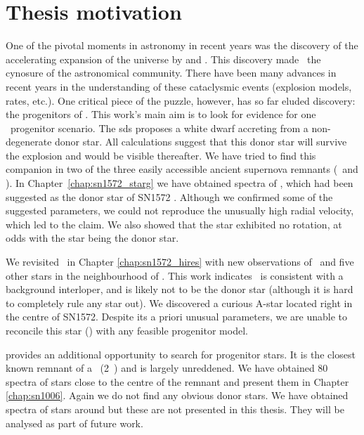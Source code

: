 \section{Thesis motivation}
One of the pivotal moments in astronomy in recent years was the discovery of the accelerating expansion of the universe by \citet{1998AJ....116.1009R} and \citet{1999ApJ...517..565P}. This discovery made \sneia\ the cynosure of the astronomical community. There have been many advances in recent years in the understanding of these cataclysmic events (explosion models, rates, etc.). One critical piece of the puzzle, however, has so far eluded discovery: the progenitors of \sneia. This work's main aim is to look for evidence for one \snia\ progenitor scenario. The \gls{sds} proposes a white dwarf accreting from a non-degenerate donor star. All calculations suggest that this donor star will survive the explosion and would be visible thereafter. We have tried to find this companion in two of the three easily accessible ancient supernova remnants (\ and ). In Chapter~\ref{chap:sn1572_starg} we have obtained spectra of \starg, which had been suggested as the donor star of SN1572 \citep{2004Natur.431.1069R}. Although we confirmed some of the suggested parameters, we could not reproduce the unusually high radial velocity, which led to the claim.  We also showed that the star exhibited no rotation, at odds with the star being the donor star.

We revisited \ in Chapter \ref{chap:sn1572_hires} with new observations of \starg\ and five other stars in the neighbourhood of . This work indicates \starg\ is consistent with a background interloper, and is likely not to be the donor star (although it is hard to completely rule any star out). We discovered a curious A-star located right in the centre of SN1572. Despite its a priori unusual parameters, we are unable to reconcile this star (\starb) with any feasible progenitor model. 

 provides an additional opportunity to search for progenitor stars. It is the closest known remnant of a \snia\ (2~\kpc) and is largely unreddened. We have obtained 80 spectra of stars close to the centre of the remnant and present them in Chapter \ref{chap:sn1006}. Again we do not find any obvious donor stars. We have obtained spectra of stars around  but these are not presented in this thesis. They will be analysed as part of future work.

